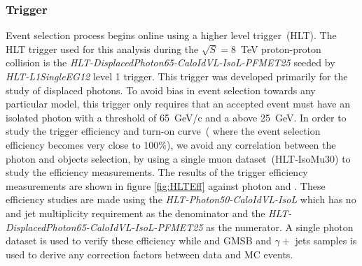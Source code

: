 \subsubsection{Trigger}
Event selection process begins online using a higher level trigger~(HLT). The HLT trigger used for this analysis during the $\sqrt{S} = 8$~TeV proton-proton collision is the \textit{HLT-DisplacedPhoton65-CaloIdVL-IsoL-PFMET25} seeded by \textit{HLT-L1SingleEG12} level 1 trigger. This trigger was developed primarily for the study of displaced photons. To avoid bias in event selection towards any particular model, this trigger only requires that an accepted event must have an isolated photon with a \pt threshold of 65~GeV/c and a \MET above 25~GeV. In order to study the trigger efficiency and turn-on curve~( where the event selection efficiency becomes very close to 100\%), we avoid  any correlation between the photon and \MET objects selection, by using a single muon dataset~(HLT-IsoMu30) to study the efficiency measurements.
The results of the trigger efficiency measurements are shown in figure \ref{fig:HLTEff} against photon \pt and \MET. These efficiency studies are made using the \textit{HLT-Photon50-CaloIdVL-IsoL} which has no \MET and jet multiplicity requirement  as the denominator and the  \textit{HLT-DisplacedPhoton65-CaloIdVL-IsoL-PFMET25} as the numerator. A single photon dataset is used to verify these efficiency while and GMSB and $\gamma +$ jets samples is used to derive any correction factors between data and MC events.

